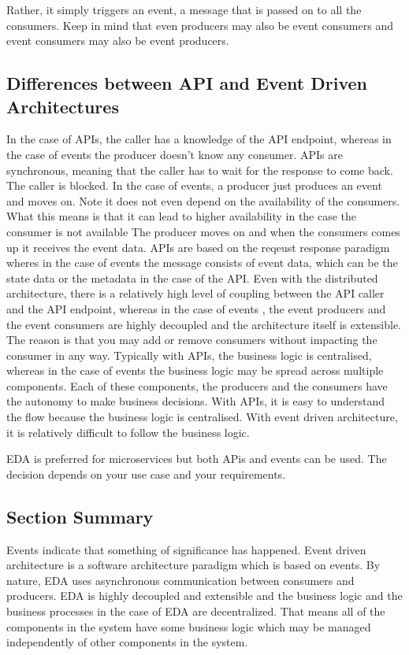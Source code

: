 \documentclass[a4paper, 11pt]{book}
\begin{document}
    Rather, it simply triggers an event, a message that is passed on to all the consumers.
    Keep in mind that even producers may also be event consumers and event consumers may also be event producers.

    \subsection{Differences between API and Event Driven Architectures}
    In the case of APIs, the caller has a knowledge of the API endpoint, whereas in the case of events the producer doesn't know any consumer.
    APIs are synchronous, meaning that the caller has to wait for the response to come back. The caller is blocked.
    In the case of events, a producer just produces an event and moves on. Note it does not even depend on the availability of the consumers.
    What this means is that it can lead to higher availability in the case the consumer is not available
    The producer moves on and when the consumers comes up it receives the event data.
    APIs are based on the reqeust response paradigm wheres in the case of events the message consists of event data, which can be the state data or the metadata in the case of the API.
    Even with the distributed architecture, there is a relatively high level of coupling between the API caller and the API endpoint, whereas in the case of events
    , the event producers and the event consumers are highly decoupled and the architecture itself is extensible.
    The reason is that you may add or remove consumers without impacting the consumer in any way.
    Typically with APIs, the business logic is centralised, whereas in the case of events the business logic may be spread across multiple components.
    Each of these components, the producers and the consumers have the autonomy to make business decisions.
    With APIs, it is easy to understand the flow because the business logic is centralised.
    With event driven architecture, it is relatively difficult to follow the business logic.

    EDA is preferred for microservices but both APis and events can be used.
    The decision depends on your use case and your requirements.

    \subsection{Section Summary}
    Events indicate that something of significance has happened.
    Event driven architecture is a software architecture paradigm which is based on events.
    By nature, EDA uses asynchronous communication between consumers and producers.
    EDA is highly decoupled and extensible and the business logic and the business processes in the case of EDA are decentralized.
    That means all of the components in the system have some business logic which may be managed independently of other components in the system.
\end{document}
